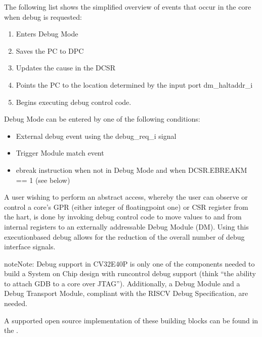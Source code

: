 \documentclass[letterpaper,10pt,english]{sphinxmanual}
\begin{document}
\sphinxAtStartPar
The following list shows the simplified overview of events that occur in the core when debug is requested:
\begin{enumerate}
%
\item {} 
\sphinxAtStartPar
Enters Debug Mode

\item {} 
\sphinxAtStartPar
Saves the PC to DPC

\item {} 
\sphinxAtStartPar
Updates the cause in the DCSR

\item {} 
\sphinxAtStartPar
Points the PC to the location determined by the input port dm\_haltaddr\_i

\item {} 
\sphinxAtStartPar
Begins executing debug control code.

\end{enumerate}

\sphinxAtStartPar
Debug Mode can be entered by one of the following conditions:
\begin{itemize}
\item {} 
\sphinxAtStartPar
External debug event using the debug\_req\_i signal

\item {} 
\sphinxAtStartPar
Trigger Module match event

\item {} 
\sphinxAtStartPar
ebreak instruction when not in Debug Mode and when DCSR.EBREAKM == 1 (see {\hyperref[\detokenize{debug:ebreak-behavior}]{}} below)

\end{itemize}

\sphinxAtStartPar
A user wishing to perform an abstract access, whereby the user can observe or control a core’s GPR (either integer of floating\sphinxhyphen{}point one) or CSR register from the hart,
is done by invoking debug control code to move values to and from internal registers to an externally addressable Debug Module (DM).
Using this execution\sphinxhyphen{}based debug allows for the reduction of the overall number of debug interface signals.

\begin{sphinxadmonition}{note}{Note:}
\sphinxAtStartPar
Debug support in CV32E40P is only one of the components needed to build a System on Chip design with run\sphinxhyphen{}control debug support (think “the ability to attach GDB to a core over JTAG”).
Additionally, a Debug Module and a Debug Transport Module, compliant with the RISC\sphinxhyphen{}V Debug Specification, are needed.

\sphinxAtStartPar
A supported open source implementation of these building blocks can be found in the .
\end{sphinxadmonition}
\end{document}
